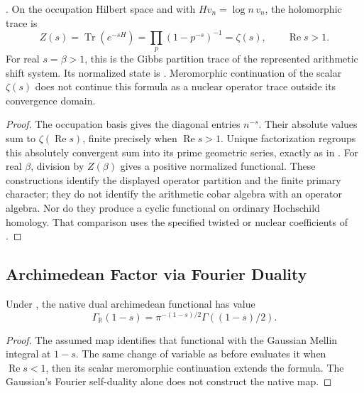 \begin{theorem}
\label{v4-arith:prim-zeta:thm:BC-partition}
\ClaimStatusProvedHere. On the occupation Hilbert space and with
$Hv_n=\log n\,v_n$, the holomorphic trace is
\begin{equation}
 \label{v4-arith:prim-zeta:eq:BC-partition}
 Z(s)=\operatorname{Tr}(e^{-sH})
     =\prod_p(1-p^{-s})^{-1}=\zeta(s),
       \qquad\operatorname{Re}s>1.
\end{equation}
For real $s=\beta>1$, this is the Gibbs partition trace of the
represented arithmetic shift system. Its normalized state is
. Meromorphic
continuation of the scalar $\zeta(s)$ does not continue this
formula as a nuclear operator trace outside its convergence domain.
\end{theorem}

\begin{proof}
The occupation basis gives the diagonal entries $n^{-s}$.
Their absolute values sum to $\zeta(\operatorname{Re}s)$, finite
precisely when $\operatorname{Re}s>1$. Unique factorization
regroups this absolutely convergent sum into its prime geometric
series, exactly as in .
For real $\beta$, division by $Z(\beta)$ gives a positive
normalized functional. These constructions identify the displayed
operator partition and the finite primary character; they do not
identify the arithmetic cobar algebra with an operator algebra.
Nor do they produce a cyclic functional on ordinary Hochschild
homology. That comparison uses the specified twisted or nuclear
coefficients of .
\end{proof}

\subsection{Archimedean Factor via Fourier Duality}
\label{v4-arith:prim-zeta:arch-fourier}

\begin{proposition}
\label{v4-arith:prim-zeta:prop:arch-cobar}
Under , the native
dual archimedean functional has value
\begin{equation}
 \Gamma_{\mathbb R}(1-s)=\pi^{-(1-s)/2}\Gamma((1-s)/2).
 \label{v4-arith:prim-zeta:eq:arch-cobar}
\end{equation}
\end{proposition}
\begin{proof}
The assumed map identifies that functional with the Gaussian Mellin
integral at \(1-s\). The same change of variable as before evaluates
it when \(\operatorname{Re}s<1\), then its scalar meromorphic
continuation extends the formula. The Gaussian's Fourier self-duality
alone does not construct the native map.
\end{proof}

